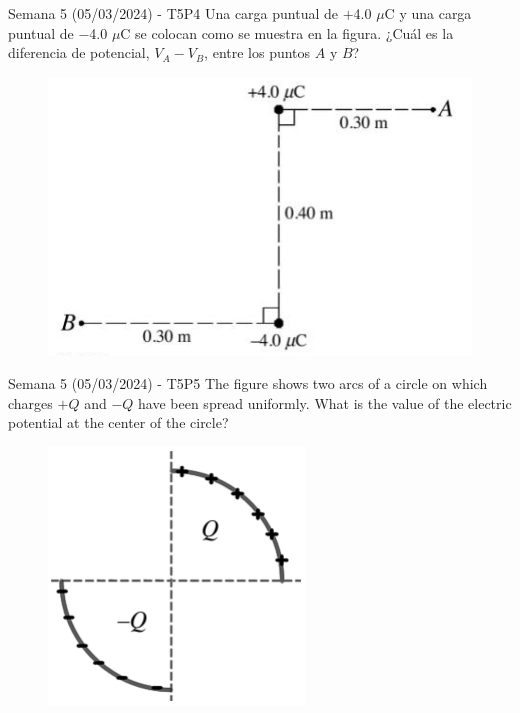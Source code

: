 \begin{frame}{Semana 5 (05/03/2024) - T5P4}
    Una carga puntual de $+$4.0 $\mu$C y una carga puntual de $-$4.0 $\mu$C se colocan como se muestra en la figura. ¿Cuál es la diferencia de potencial, $V_A-V_B$, entre los puntos $A$ y $B$?
    
    \begin{figure}
        \centering
        \includegraphics[scale=0.5]{figures/t5p4.png}
    \end{figure}
    
\end{frame}

\begin{frame}{Semana 5 (05/03/2024) - T5P5}
    The figure shows two arcs of a circle on which charges $+Q$ and $-Q$ have been spread uniformly. What is the value of the electric potential at the center of the circle?
    
    \begin{figure}
        \centering
        \includegraphics[scale=0.5]{figures/t5p5.png}
    \end{figure}
    
\end{frame}

